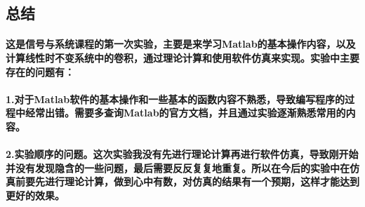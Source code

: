 \documentclass[UTF8]{ctexart}
\begin{document}
\subsection{总结}
\paragraph{
\quad 这是信号与系统课程的第一次实验，主要是来学习Matlab的基本操作内容，以及计算线性时不变系统中的卷积，通过理论计算和使用软件仿真来实现。实验中主要存在的问题有：\\
\\
1.对于Matlab软件的基本操作和一些基本的函数内容不熟悉，导致编写程序的过程中经常出错。需要多查询Matlab的官方文档，并且通过实验逐渐熟悉常用的内容。 \\
\\
2.实验顺序的问题。这次实验我没有先进行理论计算再进行软件仿真，导致刚开始并没有发现隐含的一些问题，最后需要反反复复地重复。所以在今后的实验中在仿真前要先进行理论计算，做到心中有数，对仿真的结果有一个预期，这样才能达到更好的效果。
}
\end{document}
